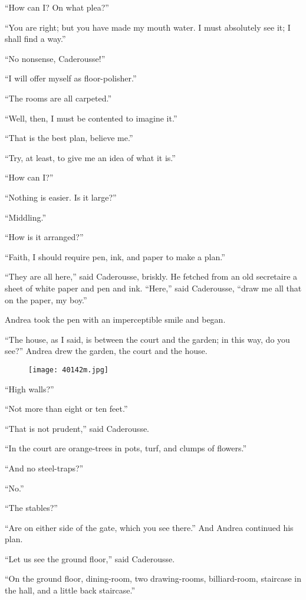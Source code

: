 “How can I? On what plea?”

“You are right; but you have made my mouth water. I must absolutely see
it; I shall find a way.”

“No nonsense, Caderousse!”

“I will offer myself as floor-polisher.”

“The rooms are all carpeted.”

“Well, then, I must be contented to imagine it.”

“That is the best plan, believe me.”

“Try, at least, to give me an idea of what it is.”

“How can I?”

“Nothing is easier. Is it large?”

“Middling.”

“How is it arranged?”

“Faith, I should require pen, ink, and paper to make a plan.”

“They are all here,” said Caderousse, briskly. He fetched from an old
secretaire a sheet of white paper and pen and ink. “Here,” said
Caderousse, “draw me all that on the paper, my boy.”

Andrea took the pen with an imperceptible smile and began.

“The house, as I said, is between the court and the garden; in this
way, do you see?” Andrea drew the garden, the court and the house.

\begin{figure}[ht]
\texttt{[image: 40142m.jpg]}
\end{figure}

“High walls?”

“Not more than eight or ten feet.”

“That is not prudent,” said Caderousse.

“In the court are orange-trees in pots, turf, and clumps of flowers.”

“And no steel-traps?”

“No.”

“The stables?”

“Are on either side of the gate, which you see there.” And Andrea
continued his plan.

“Let us see the ground floor,” said Caderousse.

“On the ground floor, dining-room, two drawing-rooms, billiard-room,
staircase in the hall, and a little back staircase.”

